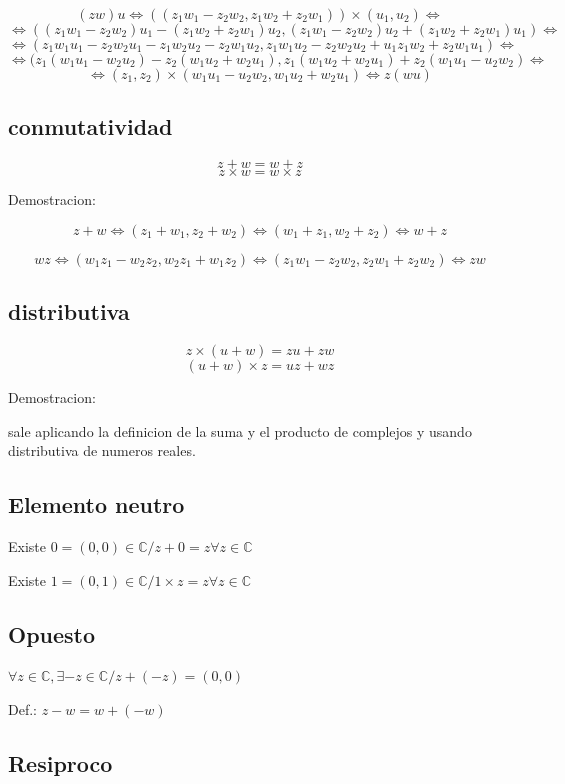 $$(zw)u \Leftrightarrow ((z_1w_1-z_2w_2,z_1w_2+z_2w_1)) \times (u_1,u_2)\Leftrightarrow$$
$$\Leftrightarrow ((z_1w_1-z_2w_2)u_1-(z_1w_2+z_2w_1)u_2,(z_1w_1-z_2w_2)u_2+(z_1w_2+z_2w_1)u_1)\Leftrightarrow$$
$$\Leftrightarrow (z_1w_1u_1-z_2w_2u_1-z_1w_2u_2-z_2w_1u_2,z_1w_1u_2-z_2w_2u_2+u_1z_1w_2+z_2w_1u_1) \Leftrightarrow $$
$$\Leftrightarrow (z_1(w_1u_1-w_2u_2)-z_2(w_1u_2+w_2u_1) ,z_1 (w_1u_2+w_2u_1) + z_2(w_1u_1-u_2w_2) \Leftrightarrow $$
$$\Leftrightarrow (z_1,z_2) \times (w_1u_1-u_2w_2,w_1u_2+w_2u_1) \Leftrightarrow z(wu) $$

\subsection{conmutatividad}
$$z+w=w+z$$
$$z \times w = w \times z$$

Demostracion:

$$ z+w \Leftrightarrow (z_1+w_1,z_2+w_2) \Leftrightarrow (w_1+z_1,w_2+z_2) \Leftrightarrow w+z$$

$$wz \Leftrightarrow (w_1z_1-w_2z_2,w_2z_1+w_1z_2) \Leftrightarrow (z_1w_1-z_2w_2,z_2w_1+z_2w_2) \Leftrightarrow zw$$

\subsection{distributiva}
$$z \times (u+w) = zu+zw$$
$$(u+w)\times z = uz + wz$$

Demostracion:

sale aplicando la definicion de la suma y el producto de complejos y usando distributiva de numeros reales.

\subsection{Elemento neutro}

Existe $0 = (0,0)  \in \mathbb{C} / z +0 =z \forall z \in \mathbb{C}$

Existe $1 = (0,1) \in \mathbb{C} / 1 \times	z = z \forall z \in \mathbb{C}$

\subsection{Opuesto}

$\forall z \in \mathbb{C}, \exists -z \in \mathbb{C} / z+(-z)=(0,0)$

Def.: $z-w = w+(-w)$

\subsection{Resiproco}

